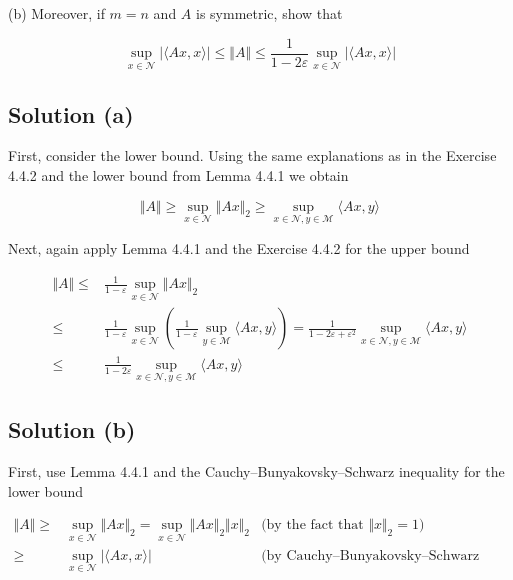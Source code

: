 \documentclass{article}
\begin{document}
(b) Moreover, if $m = n$ and $A$ is symmetric, show that

$$\sup_{x \in \mathcal N} | \langle Ax, x \rangle | \leq \Vert A \Vert \leq \frac{1}{1 - 2\varepsilon}\sup_{x \in \mathcal N} | \langle Ax, x \rangle |$$

\subsection{Solution (a)}

First, consider the lower bound. Using the same explanations as in the Exercise 4.4.2 and the lower bound from Lemma 4.4.1 we obtain

$$\Vert A \Vert \geq\sup_{x \in \mathcal N} \Vert Ax \Vert_2 \geq \sup_{x \in \mathcal N, y \in \mathcal M} \langle Ax, y \rangle$$

Next, again apply Lemma 4.4.1 and the Exercise 4.4.2 for the upper bound

\begin{equation*}
    \begin{aligned}
        \Vert A \Vert \leq & \frac{1}{1-\varepsilon}\sup_{x \in \mathcal N} \Vert Ax \Vert_2 \\
        \leq & \frac{1}{1-\varepsilon}\sup_{x \in \mathcal N}\left( \frac{1}{1-\varepsilon} \sup_{y \in \mathcal M} \langle Ax, y \rangle \right) = \frac{1}{1 - 2\varepsilon + \varepsilon^2}\sup_{x \in \mathcal N, y \in \mathcal M}\langle Ax, y \rangle \\
        \leq & \frac{1}{1-2\varepsilon}\sup_{x \in \mathcal N, y \in \mathcal M}\langle Ax, y \rangle
    \end{aligned}
\end{equation*}

\subsection{Solution (b)}

First, use Lemma 4.4.1 and the Cauchy–Bunyakovsky–Schwarz inequality for the lower bound

\begin{equation*}
    \begin{aligned}
        \Vert A \Vert \geq & \sup_{x \in \mathcal N} \Vert A x \Vert_2 = \sup_{x \in \mathcal N} \Vert Ax \Vert_2 \Vert x \Vert_2 &\text{(by the fact that $\Vert x \Vert_2 = 1$)} \\
        \geq & \sup_{x \in \mathcal N} | \langle Ax,  x \rangle | &\text{(by Cauchy–Bunyakovsky–Schwarz inequality)}
    \end{aligned}
\end{equation*}
\end{document}
